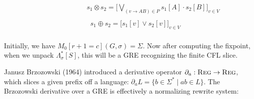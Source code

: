 \documentclass[portrait,a0b,final,a4resizeable]{a0poster}
\def\jointspacing{\vspace{0.3in}}
\begin{document}
\begin{poster}
\begin{multicols}{2}
\vspace{-2cm}
\setlength{\columnseprule}{0pt}
\setlength{\columnsep}{-2cm}
\begin{multicols}{2}
\begin{eqnarray*}
\hspace{3cm}s_1\otimes s_2 = \Big[\bigvee_{(v \rightarrow AB) \in P} s_1[A] \cdot s_2[B] \Big]_{v \in V} \\
\end{eqnarray*} \break\vspace{-0.45cm}
\begin{eqnarray*}
\phantom{--}s_1\oplus s_2 = \big[s_1[v] \vee s_2[v]\big]_{v \in V} \\
\end{eqnarray*}
\end{multicols}

\hspace*{2cm}\begin{minipage}[c]{0.90\columnwidth}
Initially, we have $M_0[r+1=c](G, \sigma) = \Sigma$.
Now after computing the fixpoint, when we unpack $\Lambda^*_\sigma[S]$, this will be a GRE recognizing the finite CFL slice.
\end{minipage}

\jointspacing


      \jointspacing

      \hspace*{2cm}\begin{minipage}[c]{0.90\columnwidth}
Janusz Brzozowski (1964) introduced a derivative operator $\partial_a: \textsc{Reg} \rightarrow \textsc{Reg}$, which slices a given prefix off a language: $\partial_a L = \{b \in \Sigma^* \mid ab \in L\}$. The Brzozowski derivative over a GRE is effectively a normalizing rewrite system:
      \end{minipage}


\end{multicols}
\end{poster}
\end{document}
